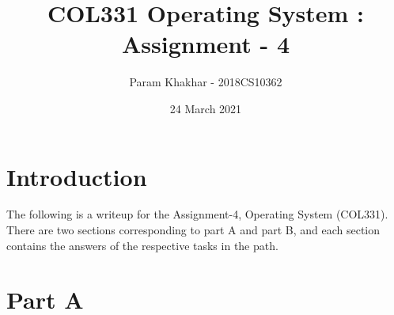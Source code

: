 \documentclass[12pt]{article}
\title{COL331 Operating System : Assignment - 4}
\author{Param Khakhar - 2018CS10362}
\date{24 March 2021}
\begin{document}
\maketitle

\section *{Introduction}

The following is a writeup for the Assignment-4, Operating System (COL331). There are two sections corresponding to part A and part B, and each section contains the answers of the respective tasks in the path.

\section*{Part A}






\end{document}
